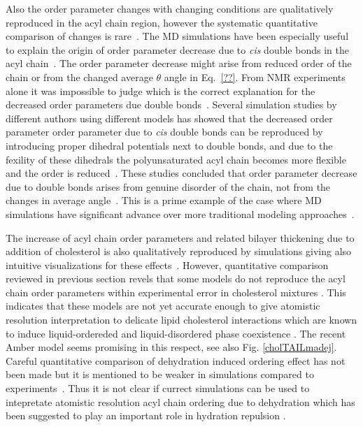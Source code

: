\documentclass[aps,prl,superscriptaddress,twocolumn]{revtex4}
\begin{document}
Also the order parameter changes with changing conditions are qualitatively reproduced in the acyl chain region, 
however the systematic quantitative comparison of changes is rare~\cite{ollila07a,ferreira13,madej15}.
The MD simulations have been especially useful to explain the origin of order parameter decrease
due to {\it cis} double bonds in the acyl chain~\cite{??,ollila07a}. The order parameter decrease might arise
from reduced order of the chain or from the changed average $\theta$ angle in Eq.~\ref{??}.
From NMR experiments alone it was impossible to judge which is the correct explanation for
the decreased order parameters due double bonds~\cite{??}. Several simulation studies by different
authors using different models has showed that the decreased order parameter order parameter due to {\it cis} double
bonds can be reproduced by introducing proper dihedral potentials next to double bonds,
and due to the fexility of these dihedrals the polyunsaturated acyl chain becomes more flexible and
the order is reduced~\cite{??}. These studies concluded that order parameter decrease due to double 
bonds arises from genuine disorder of the chain, not from the changes in average angle~\cite{??}.
This is a prime example of the case where MD simulations have significant advance over more traditional 
modeling approaches~\cite{??}.

The increase of acyl chain order parameters and related bilayer thickening due to addition of cholesterol 
is also qualitatively reproduced by simulations giving also intuitive visualizations for these effects~\cite{??,ferreira13,madej15}. 
However, quantitative comparison reviewed in previous section revels that some models do not reproduce the 
acyl chain order parameters within experimental error in cholesterol mixtures \cite{lim12,ferreira13}.
This indicates that these models are not yet accurate enough to give atomistic resolution interpretation
to delicate lipid cholesterol interactions which are known to induce liquid-ordereded and liquid-disordered
phase coexistence \cite{??}. The recent Amber model \cite{madej15} seems promising in this respect, see also Fig. \ref{cholTAILmadej}. 
Careful quantitative comparison of dehydration induced ordering effect has not been made but it is mentioned to be 
weaker in simulations compared to experiments~\cite{hogberg06}. Thus it is not clear if currect simulations
can be used to intepretate atomistic resolution acyl chain ordering due to dehydration which has been
suggested to play an important role in hydration repulsion \cite{??}.
\end{document}
